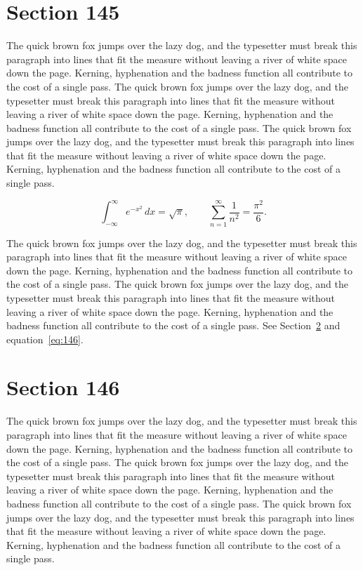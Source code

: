 \documentclass{article}
\begin{document}
\section{Section 145}
\label{sec:145}
The quick brown fox jumps over the lazy dog, and the typesetter must break this paragraph into lines that fit the measure without leaving a river of white space down the page. Kerning, hyphenation and the badness function all contribute to the cost of a single pass. The quick brown fox jumps over the lazy dog, and the typesetter must break this paragraph into lines that fit the measure without leaving a river of white space down the page. Kerning, hyphenation and the badness function all contribute to the cost of a single pass. The quick brown fox jumps over the lazy dog, and the typesetter must break this paragraph into lines that fit the measure without leaving a river of white space down the page. Kerning, hyphenation and the badness function all contribute to the cost of a single pass. 

\begin{equation}\label{eq:145}
\int_{-\infty}^{\infty} e^{-x^{2}}\,dx = \sqrt{\pi}, \qquad
\sum_{n=1}^{\infty} \frac{1}{n^{2}} = \frac{\pi^{2}}{6}.
\end{equation}

The quick brown fox jumps over the lazy dog, and the typesetter must break this paragraph into lines that fit the measure without leaving a river of white space down the page. Kerning, hyphenation and the badness function all contribute to the cost of a single pass. The quick brown fox jumps over the lazy dog, and the typesetter must break this paragraph into lines that fit the measure without leaving a river of white space down the page. Kerning, hyphenation and the badness function all contribute to the cost of a single pass. 
See Section~\ref{sec:146} and equation~\eqref{eq:146}.
\section{Section 146}
\label{sec:146}
The quick brown fox jumps over the lazy dog, and the typesetter must break this paragraph into lines that fit the measure without leaving a river of white space down the page. Kerning, hyphenation and the badness function all contribute to the cost of a single pass. The quick brown fox jumps over the lazy dog, and the typesetter must break this paragraph into lines that fit the measure without leaving a river of white space down the page. Kerning, hyphenation and the badness function all contribute to the cost of a single pass. The quick brown fox jumps over the lazy dog, and the typesetter must break this paragraph into lines that fit the measure without leaving a river of white space down the page. Kerning, hyphenation and the badness function all contribute to the cost of a single pass. 
\end{document}
